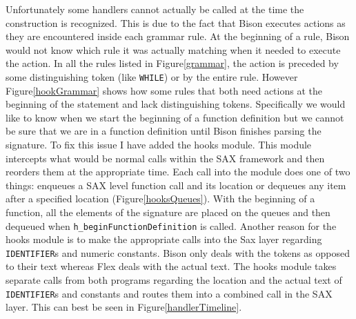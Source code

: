 \documentclass[12pt]{report}
\def\lstlistingname{Figure}
\newcommand{\refCode}{\lstlistingname \hspace{1mm}}
\begin{document}
Unfortunately some handlers cannot actually be called at the time the construction is recognized. This 
is due to the fact that Bison executes actions as they are encountered inside each grammar rule. At the 
beginning of a rule, Bison would not know which rule it was actually matching when it needed to 
execute the action. In all the rules listed in \refCode \ref{grammar}, the action is preceded by some 
distinguishing token (like \lstinline{WHILE}) or by the entire rule. However \refCode \ref{hookGrammar} 
shows how some rules that both need actions at the beginning of the statement and lack distinguishing 
tokens. Specifically we would like to know when we start the beginning of a function definition but we 
cannot be sure that we are in a function definition until Bison finishes parsing the signature. To fix this 
issue I have added the hooks module. This module intercepts what would be normal calls within the 
SAX framework and then reorders them at the appropriate time. Each call into the module does one of 
two things: enqueues a SAX level function call and its location or dequeues any item after a specified 
location (\refCode \ref{hooksQueues}). With the beginning of a function, all the elements of the 
signature are placed on the queues and then dequeued when \lstinline{h_beginFunctionDefinition} is 
called. Another reason for the hooks module is to make the appropriate calls into the Sax layer 
regarding \lstinline{IDENTIFIER}s and numeric constants. Bison only deals with the tokens as opposed 
to their text whereas Flex deals with the actual text. The hooks module takes separate calls from both 
programs regarding the location and the actual text of \lstinline{IDENTIFIER}s and constants and routes 
them into a combined call in the SAX layer. This can best be seen in \refCode \ref{handlerTimeline}.
\end{document}
